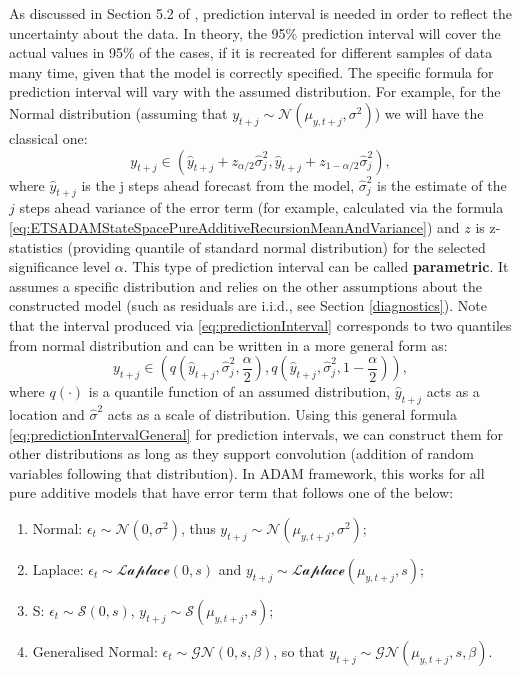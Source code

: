 \documentclass[
]{book}
\providecommand{\tightlist}{%
  \setlength{\itemsep}{0pt}\setlength{\parskip}{0pt}}
\theoremstyle{definition}
\theoremstyle{definition}
\theoremstyle{definition}
\theoremstyle{definition}
\theoremstyle{remark}
\begin{document}
As discussed in Section 5.2 of \citet{SvetunkovSBA}, prediction interval is needed in order to reflect the uncertainty about the data. In theory, the 95\% prediction interval will cover the actual values in 95\% of the cases, if it is recreated for different samples of data many time, given that the model is correctly specified. The specific formula for prediction interval will vary with the assumed distribution. For example, for the Normal distribution (assuming that \(y_{t+j} \sim \mathcal{N}(\mu_{y, t+j}, \sigma^2)\)) we will have the classical one:
\begin{equation}
    y_{t+j} \in (\hat{y}_{t+j} + z_{\alpha/2} \hat{\sigma}_j^2, \hat{y}_{t+j} + z_{1-\alpha/2} \hat{\sigma}_j^2),
    \label{eq:predictionInterval}
\end{equation}
where \(\hat{y}_{t+j}\) is the j steps ahead forecast from the model, \(\hat{\sigma}_j^2\) is the estimate of the \(j\) steps ahead variance of the error term (for example, calculated via the formula \eqref{eq:ETSADAMStateSpacePureAdditiveRecursionMeanAndVariance}) and \(z\) is z-statistics (providing quantile of standard normal distribution) for the selected significance level \(\alpha\). This type of prediction interval can be called \textbf{parametric}. It assumes a specific distribution and relies on the other assumptions about the constructed model (such as residuals are i.i.d., see Section \ref{diagnostics}). Note that the interval produced via \eqref{eq:predictionInterval} corresponds to two quantiles from normal distribution and can be written in a more general form as:
\begin{equation}
    y_{t+j} \in \left(q \left(\hat{y}_{t+j},\hat{\sigma}_j^2,\frac{\alpha}{2}\right), q\left(\hat{y}_{t+j},\hat{\sigma}_j^2,1-\frac{\alpha}{2}\right)\right),
    \label{eq:predictionIntervalGeneral}
\end{equation}
where \(q(\cdot)\) is a quantile function of an assumed distribution, \(\hat{y}_{t+j}\) acts as a location and \(\hat{\sigma}^2\) acts as a scale of distribution. Using this general formula \eqref{eq:predictionIntervalGeneral} for prediction intervals, we can construct them for other distributions as long as they support convolution (addition of random variables following that distribution). In ADAM framework, this works for all pure additive models that have error term that follows one of the below:

\begin{enumerate}
\def\labelenumi{\arabic{enumi}.}
\tightlist
\item
  Normal: \(\epsilon_t \sim \mathcal{N}(0, \sigma^2)\), thus \(y_{t+j} \sim \mathcal{N}(\mu_{y, t+j}, \sigma^2)\);
\item
  Laplace: \(\epsilon_t \sim \mathcal{Laplace}(0, s)\) and \(y_{t+j} \sim \mathcal{Laplace}(\mu_{y, t+j}, s)\);
\item
  S: \(\epsilon_t \sim \mathcal{S}(0, s)\), \(y_{t+j} \sim \mathcal{S}(\mu_{y, t+j}, s)\);
\item
  Generalised Normal: \(\epsilon_t \sim \mathcal{GN}(0, s, \beta)\), so that \(y_{t+j} \sim \mathcal{GN}(\mu_{y, t+j}, s, \beta)\).
\end{enumerate}
\end{document}
